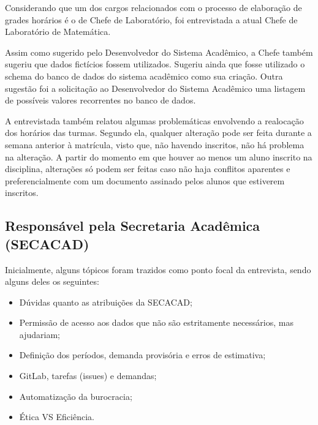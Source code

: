 Considerando que um dos cargos relacionados com o processo de elaboração de grades horários é o de Chefe de Laboratório, foi entrevistada a atual Chefe de Laboratório de Matemática.

Assim como sugerido pelo Desenvolvedor do Sistema Acadêmico, a Chefe também sugeriu que dados fictícios fossem utilizados. Sugeriu ainda que fosse utilizado o schema do banco de dados do sistema acadêmico como sua criação. Outra sugestão foi a solicitação ao Desenvolvedor do Sistema Acadêmico uma listagem de possíveis valores recorrentes no banco de dados.

A entrevistada também relatou algumas problemáticas envolvendo a realocação dos horários das turmas. Segundo ela, qualquer alteração pode ser feita durante a semana anterior à matrícula, visto que, não havendo inscritos, não há problema na alteração. A partir do momento em que houver ao menos um aluno inscrito na disciplina, alterações só podem ser feitas caso não haja conflitos aparentes e preferencialmente com um documento assinado pelos alunos que estiverem inscritos.

\subsection{Responsável pela Secretaria Acadêmica (SECACAD)} %

Inicialmente, alguns tópicos foram trazidos como ponto focal da entrevista, sendo alguns deles os seguintes:

\begin{itemize}
  \item Dúvidas quanto as atribuições da SECACAD;
  \item Permissão de acesso aos dados que não são estritamente necessários, mas ajudariam;
  \item Definição dos períodos, demanda provisória e erros de estimativa;
  \item GitLab, tarefas (issues) e demandas;
  \item Automatização da burocracia;
  \item Ética VS Eficiência.
\end{itemize}


